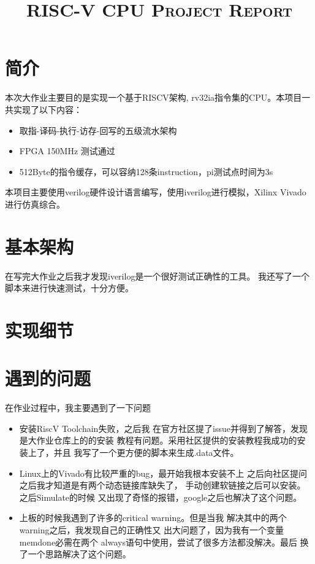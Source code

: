 
\title{\Huge\textsc{RISC-V CPU Project Report}}

\maketitle
 
\section{简介}
本次大作业主要目的是实现一个基于RISCV架构, rv32ia指令集的CPU。本项目一共实现了以下内容：
\begin{itemize}
		\item 取指-译码-执行-访存-回写的五级流水架构
		\item FPGA 150MHz 测试通过
		\item 512Byte的指令缓存，可以容纳128条instruction，pi测试点时间为3s
\end{itemize}

本项目主要使用verilog硬件设计语言编写，使用iverilog进行模拟，Xilinx Vivado进行仿真综合。
\section{基本架构}
		在写完大作业之后我才发现iverilog是一个很好测试正确性的工具。
		我还写了一个脚本来进行快速测试，十分方便。
\section{实现细节}
\section{遇到的问题}
在作业过程中，我主要遇到了一下问题
\begin{itemize}
		\item 安装RiscV Toolchain失败，之后我
				在官方社区提了issue并得到了解答，发现是大作业仓库上的的安装
				教程有问题。采用社区提供的安装教程我成功的安装上了，并且
				我写了一个更方便的脚本来生成.data文件。
		\item Linux上的Vivado有比较严重的bug，最开始我根本安装不上
				之后向社区提问之后我才知道是有两个动态链接库缺失了，
				手动创建软链接之后可以安装。之后Simulate的时候
				又出现了奇怪的报错，google之后也解决了这个问题。
		\item 上板的时候我遇到了许多的critical warning。但是当我
				解决其中的两个warning之后，我发现自己的正确性又
				出大问题了，因为我有一个变量memdone必需在两个
				always语句中使用，尝试了很多方法都没解决。最后
				换了一个思路解决了这个问题。
\end{itemize}
